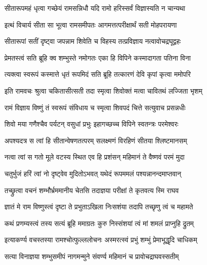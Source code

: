 \twolineshloka
{सीतारूपमहं धृत्वा गच्छेयं रामसन्निधौ}
{यदि रामो हरिस्सर्वं विज्ञास्यति न चान्यथा} %

\twolineshloka
{इत्थं विचार्य सीता सा भूत्वा रामसमीपतः}
{आगमत्तत्परीक्षार्थं सती मोहपरायणा} %

\twolineshloka
{सीतारूपां सतीं दृष्ट्वा जपन्नाम शिवेति च}
{विहस्य तत्प्रविज्ञाय नत्वावोचद्रघूद्वहः} %


\twolineshloka
{प्रेमतस्त्वं सति ब्रूहि क्व शम्भुस्ते नमोगतः}
{एका हि विपिने कस्मादागता पतिना विना} %

\twolineshloka
{त्यक्त्वा स्वरूपं कस्मात्ते धृतं रूपमिदं सति}
{ब्रूहि तत्कारणं देवि कृपां कृत्वा ममोपरि}%


\twolineshloka
{इति रामवचः श्रुत्वा चकितासीत्सती तदा}
{स्मृत्वा शिवोक्तं मत्वा चावितथं लज्जिता भृशम्} %

\twolineshloka
{रामं विज्ञाय विष्णुं तं स्वरूपं संविधाय च}
{स्मृत्वा शिवपदं चित्ते सत्युवाच प्रसन्नधीः} %

\twolineshloka
{शिवो मया गणैश्चैव पर्यटन् वसुधां प्रभुः}
{इहागच्छच्च विपिने स्वतन्त्रः परमेश्वरः} %

\twolineshloka
{अपश्यदत्र स त्वां हि सीतान्वेषणतत्परम्}
{सलक्ष्मणं विरहिणं सीतया श्लिष्टमानसम्} %

\twolineshloka
{नत्वा त्वां स गतो मूले वटस्य स्थित एव हि}
{प्रशंसन् महिमानं ते वैष्णवं परमं मुदा} %

\twolineshloka
{चतुर्भुजं हरिं त्वां नो दृष्ट्वेव मुदितोऽभवत्}
{यथेदं रूपममलं पश्यन्नानन्दमाप्तवान्} %

\twolineshloka
{तच्छ्रुत्वा वचनं शम्भौर्भ्रममानीय चेतसि}
{तदाज्ञया परीक्षां ते कृतवत्य स्मि राघव} %

\twolineshloka
{ज्ञातं मे राम विष्णुस्त्वं दृष्टा ते प्रभुताऽखिला}
{निःसशंया तदापि तच्छृणु त्वं च महामते} %

\twolineshloka
{कथं प्रणम्यस्त्वं तस्य सत्यं ब्रूहि ममाग्रतः}
{कुरु निस्संशयां त्वं मां शमलं प्राप्नुहि द्रुतम्} %


\twolineshloka
{इत्याकर्ण्य वचस्तस्या रामश्चोत्फुल्ललोचनः}
{अस्मरत्स्वं प्रभुं शम्भुं प्रेमाभूद्धृदि चाधिकम्} %

\twolineshloka
{सत्या विनाज्ञया शम्भुसमीपं नागमन्मुने}
{संवर्ण्य महिमानं च प्रावोचद्राघवस्सतीम्} %

